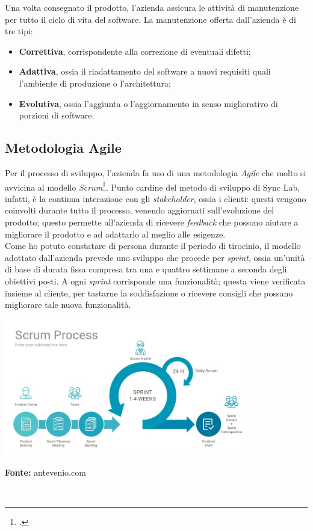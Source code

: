 Una volta consegnato il prodotto, l'azienda assicura le attività di manutenzione per tutto il ciclo di vita del software. La manutenzione offerta dall'azienda è di tre tipi:
\begin{itemize}
  \item \textbf{Correttiva}, corrispondente alla correzione di eventuali difetti;
  \item \textbf{Adattiva}, ossia il riadattamento del software a nuovi requisiti quali l'ambiente di produzione o l'architettura;
  \item \textbf{Evolutiva}, ossia l'aggiunta o l'aggiornamento in senso migliorativo di porzioni di software.
\end{itemize}

\subsection{Metodologia Agile}

Per il processo di sviluppo, l'azienda fa uso di una metodologia \textit{Agile} che molto si avvicina al modello \textit{Scrum}\footcite{tec:scrum}. Punto cardine del metodo di sviluppo di Sync Lab, infatti, è la continua interazione con gli \textit{stakeholder}, ossia i clienti: questi vengono coinvolti durante tutto il processo, venendo aggiornati sull'evoluzione del prodotto; questo permette all'azienda di ricevere \textit{feedback} che possono aiutare a migliorare il prodotto e ad adattarlo al meglio alle esigenze. \\
Come ho potuto constatare di persona durante il periodo di tirocinio, il modello adottato dall'azienda prevede uno sviluppo che procede per \textit{sprint}, ossia un'unità di base di durata fissa compresa tra una e quattro settimane a seconda degli obiettivi posti. A ogni \textit{sprint} corrisponde una funzionalità; questa viene verificata insieme al cliente, per tastarne la soddisfazione o ricevere consigli che possano migliorare tale nuova funzionalità. \\

\begin{minipage}{\linewidth}
  \centering
    \includegraphics[height=6cm]{immagini/scrumprocess}
  \caption*{\textbf{Fonte:} antevenio.com}
\end{minipage} \\

